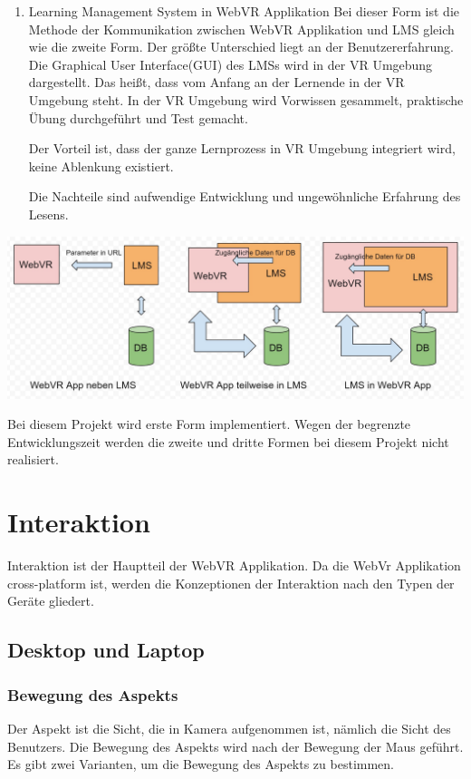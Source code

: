 \begin{enumerate}
    \item Learning Management System in WebVR Applikation
     \subitem Bei dieser Form ist die Methode der Kommunikation zwischen WebVR Applikation und LMS gleich wie die zweite Form. Der größte Unterschied liegt an der Benutzererfahrung. Die Graphical User Interface(GUI) des LMSs wird in der VR Umgebung dargestellt. Das heißt, dass vom Anfang an der Lernende in der VR Umgebung steht. In der VR Umgebung wird Vorwissen gesammelt, praktische Übung durchgeführt und Test gemacht.
     
     Der Vorteil ist, dass der ganze Lernprozess in VR Umgebung integriert wird, keine Ablenkung existiert.
     
     Die Nachteile sind aufwendige Entwicklung und ungewöhnliche Erfahrung des Lesens.
\end{enumerate}
\includegraphics[width=\textwidth]{images/formenDerVerbindung.jpg}

Bei diesem Projekt wird erste Form implementiert. Wegen der begrenzte Entwicklungszeit werden die zweite und dritte Formen bei diesem Projekt nicht realisiert.

\section{Interaktion}
Interaktion ist der Hauptteil der WebVR Applikation. Da die WebVr Applikation cross-platform ist, werden die Konzeptionen der Interaktion nach den Typen der Geräte gliedert.

 \subsection{Desktop und Laptop}
  \subsubsection{Bewegung des Aspekts}
  Der Aspekt ist die Sicht, die in Kamera aufgenommen ist, nämlich die Sicht des Benutzers. Die Bewegung des Aspekts wird nach der Bewegung der Maus geführt. Es gibt zwei Varianten, um die Bewegung des Aspekts zu bestimmen.
  
